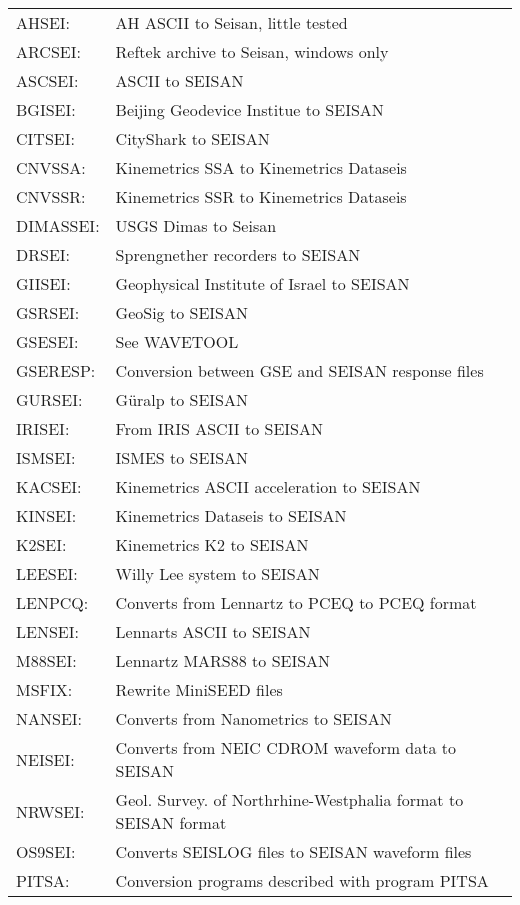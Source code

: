 \begin{tabular}{lp{10cm}}
AHSEI:  & AH ASCII to Seisan, little tested\\
ARCSEI: & Reftek archive to Seisan, windows only \\ %
ASCSEI: & ASCII to SEISAN \\
BGISEI: & Beijing Geodevice Institue to SEISAN \\
CITSEI: & CityShark to SEISAN \\
CNVSSA: & Kinemetrics SSA to Kinemetrics Dataseis \\
CNVSSR: & Kinemetrics SSR to Kinemetrics Dataseis \\
DIMASSEI: & USGS Dimas to Seisan\\
DRSEI: & Sprengnether recorders to SEISAN \\
GIISEI: & Geophysical Institute of Israel to SEISAN \\
GSRSEI: & GeoSig to SEISAN \\
GSESEI: & See WAVETOOL \\
GSERESP: & Conversion between GSE and SEISAN response files \\
GURSEI: & G\"uralp to SEISAN \\
IRISEI: & From IRIS ASCII to SEISAN  \\
ISMSEI: & ISMES to SEISAN \\
KACSEI: & Kinemetrics ASCII acceleration to SEISAN \\
KINSEI: & Kinemetrics Dataseis to SEISAN \\
K2SEI: & Kinemetrics K2 to SEISAN \\
LEESEI: & Willy Lee system to SEISAN \\
LENPCQ: & Converts from Lennartz to PCEQ to PCEQ format \\
LENSEI: & Lennarts ASCII to SEISAN \\
M88SEI: & Lennartz MARS88 to SEISAN \\
MSFIX: & Rewrite MiniSEED files \\
NANSEI: & Converts from Nanometrics to SEISAN  \\
NEISEI: & Converts from NEIC CDROM waveform data to SEISAN \\
NRWSEI: & Geol. Survey. of Northrhine-Westphalia format to SEISAN format\index{NRWSEI}\index{Norhtrhine-Westphalia} \\
OS9SEI: & Converts SEISLOG files to SEISAN waveform files \\
PITSA: & Conversion programs described with program PITSA \\

\end{tabular}

